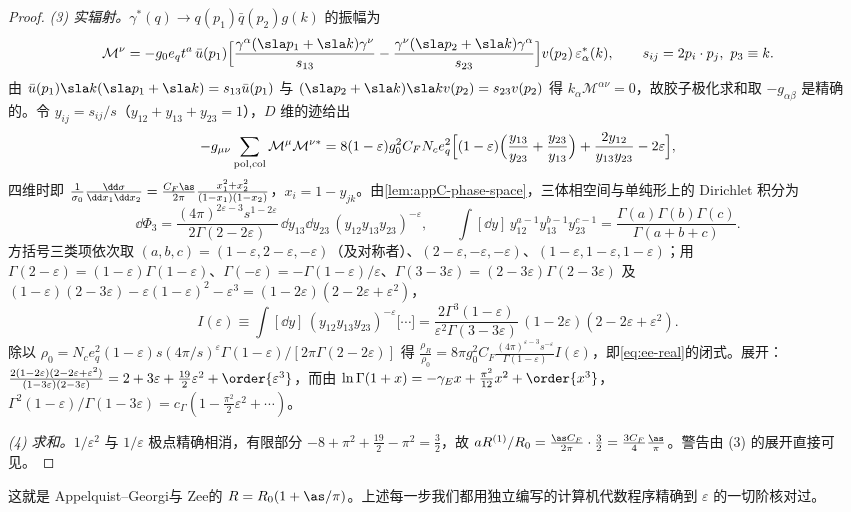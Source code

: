 \begin{proof}
\emph{(3) 实辐射。}$\gamma^*(q)\to q(p_1)\bar q(p_2)g(k)$ 的振幅为
\[
\mathcal M^\nu=-g_0e_qt^a\,\bar u(p_1)\Big[\frac{\gamma^\alpha(\sla p_1+\sla k)\gamma^\nu}{s_{13}}-\frac{\gamma^\nu(\sla p_2+\sla k)\gamma^\alpha}{s_{23}}\Big]v(p_2)\,\varepsilon^*_\alpha(k),\qquad s_{ij}=2p_i\cdot p_j,\ p_3\equiv k .
\]
由 $\bar u(p_1)\sla k(\sla p_1+\sla k)=s_{13}\bar u(p_1)$ 与 $(\sla p_2+\sla k)\sla kv(p_2)=s_{23}v(p_2)$ 得 $k_\alpha\mathcal M^{\alpha\nu}=0$，故胶子极化求和取 $-g_{\alpha\beta}$ 是精确的。令 $y_{ij}=s_{ij}/s$（$y_{12}+y_{13}+y_{23}=1$），$D$ 维的迹给出
\begin{equation}\label{eq:ee-realme}
-g_{\mu\nu}\sum_{\rm pol,col}\mathcal M^\mu\mathcal M^{\nu*}=8(1-\varepsilon)g_0^2C_FN_ce_q^2\Big[(1-\varepsilon)\Big(\frac{y_{13}}{y_{23}}+\frac{y_{23}}{y_{13}}\Big)+\frac{2y_{12}}{y_{13}y_{23}}-2\varepsilon\Big] ,
\end{equation}
四维时即 $\frac{1}{\sigma_0}\frac{\dd\sigma}{\dd x_1\dd x_2}=\frac{C_F\as}{2\pi}\frac{x_1^2+x_2^2}{(1-x_1)(1-x_2)}$，$x_i=1-y_{jk}$。由\cref{lem:appC-phase-space}，三体相空间与单纯形上的 Dirichlet 积分为
\[
\dd\Phi_3=\frac{(4\pi)^{2\varepsilon-3}s^{1-2\varepsilon}}{2\Gamma(2-2\varepsilon)}\,\dd y_{13}\dd y_{23}\,(y_{12}y_{13}y_{23})^{-\varepsilon},\qquad
\int[\dd y]\,y_{12}^{a-1}y_{13}^{b-1}y_{23}^{c-1}=\frac{\Gamma(a)\Gamma(b)\Gamma(c)}{\Gamma(a+b+c)} .
\]
方括号三类项依次取 $(a,b,c)=(1-\varepsilon,2-\varepsilon,-\varepsilon)$（及对称者）、$(2-\varepsilon,-\varepsilon,-\varepsilon)$、$(1-\varepsilon,1-\varepsilon,1-\varepsilon)$；用 $\Gamma(2-\varepsilon)=(1-\varepsilon)\Gamma(1-\varepsilon)$、$\Gamma(-\varepsilon)=-\Gamma(1-\varepsilon)/\varepsilon$、$\Gamma(3-3\varepsilon)=(2-3\varepsilon)\Gamma(2-3\varepsilon)$ 及 $(1-\varepsilon)(2-3\varepsilon)-\varepsilon(1-\varepsilon)^2-\varepsilon^3=(1-2\varepsilon)(2-2\varepsilon+\varepsilon^2)$，
\[
I(\varepsilon)\equiv\int[\dd y]\,(y_{12}y_{13}y_{23})^{-\varepsilon}\big[\cdots\big]=\frac{2\Gamma^3(1-\varepsilon)}{\varepsilon^2\Gamma(3-3\varepsilon)}\,(1-2\varepsilon)(2-2\varepsilon+\varepsilon^2).
\]
除以 $\rho_0=N_ce_q^2(1-\varepsilon)s(4\pi/s)^\varepsilon\Gamma(1-\varepsilon)/[2\pi\Gamma(2-2\varepsilon)]$ 得 $\frac{\rho_R}{\rho_0}=8\pi g_0^2C_F\frac{(4\pi)^{\varepsilon-3}s^{-\varepsilon}}{\Gamma(1-\varepsilon)}I(\varepsilon)$，即\cref{eq:ee-real}的闭式。展开：$\frac{2(1-2\varepsilon)(2-2\varepsilon+\varepsilon^2)}{(1-3\varepsilon)(2-3\varepsilon)}=2+3\varepsilon+\frac{19}2\varepsilon^2+\order{\varepsilon^3}$，而由 $\ln\Gamma(1+x)=-\gamma_Ex+\frac{\pi^2}{12}x^2+\order{x^3}$，$\Gamma^2(1-\varepsilon)/\Gamma(1-3\varepsilon)=c_\Gamma(1-\frac{\pi^2}2\varepsilon^2+\cdots)$。

\emph{(4) 求和。}$1/\varepsilon^2$ 与 $1/\varepsilon$ 极点精确相消，有限部分 $-8+\pi^2+\frac{19}2-\pi^2=\frac32$，故 $aR^{(1)}/R_0=\frac{\as C_F}{2\pi}\cdot\frac32=\frac{3C_F}4\frac{\as}\pi$。警告由 (3) 的展开直接可见。
\end{proof}
这就是 Appelquist--Georgi\cite{AppelquistGeorgi1973}与 Zee\cite{Zee1973}的 $R=R_0(1+\as/\pi)$。上述每一步我们都用独立编写的计算机代数程序精确到 $\varepsilon$ 的一切阶核对过。


